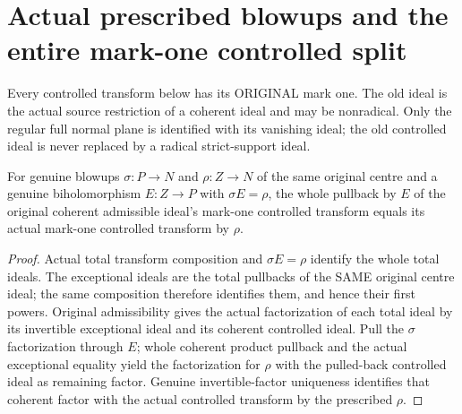 \section{Actual prescribed blowups and the entire mark-one controlled split}

Every controlled transform below has its ORIGINAL mark one. The old ideal
is the actual source restriction of a coherent ideal and may be nonradical.
Only the regular full normal plane is identified with its vanishing ideal;
the old controlled ideal is never replaced by a radical strict-support ideal.

\begin{lemma}
\label{hir:disjoint-actual-controlled-transport}
\leanok
For genuine blowups $\sigma:P\to N$ and $\rho:Z\to N$ of the same original
centre and a genuine biholomorphism $E:Z\to P$ with $\sigma E=\rho$, the whole
pullback by $E$ of the original coherent admissible ideal's mark-one controlled
transform equals its actual mark-one controlled transform by $\rho$.
\end{lemma}
\begin{proof}
Actual total transform composition and $\sigma E=\rho$ identify the whole
total ideals. The exceptional ideals are the total pullbacks of the SAME
original centre ideal; the same composition therefore identifies them, and
hence their first powers. Original admissibility gives the actual factorization
of each total ideal by its invertible exceptional ideal and its coherent
controlled ideal. Pull the $\sigma$ factorization through $E$; whole coherent
product pullback and the actual exceptional equality yield the factorization
for $\rho$ with the pulled-back controlled ideal as remaining factor. Genuine
invertible-factor uniqueness identifies that coherent factor with the actual
controlled transform by the prescribed $\rho$.
\end{proof}

